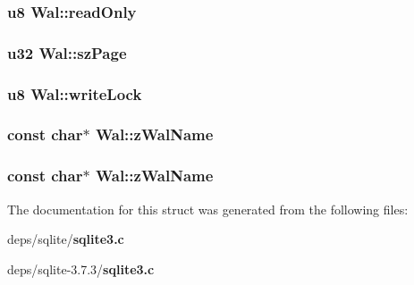 \subsubsection{\setlength{\rightskip}{0pt plus 5cm}\bf{u8} \bf{Wal::read\-Only}}\label{structWal_908175d91380ac160cc6b56990682e7d}


\subsubsection{\setlength{\rightskip}{0pt plus 5cm}\bf{u32} \bf{Wal::sz\-Page}}\label{structWal_c554b167375ea0923cec25a4037a9e8f}


\subsubsection{\setlength{\rightskip}{0pt plus 5cm}\bf{u8} \bf{Wal::write\-Lock}}\label{structWal_d87dc8bf96a523c3e8402ab030a92468}


\subsubsection{\setlength{\rightskip}{0pt plus 5cm}const char$\ast$ \bf{Wal::z\-Wal\-Name}}\label{structWal_6b5cf0f930c69a03294911edba8ab1a2}


\subsubsection{\setlength{\rightskip}{0pt plus 5cm}const char$\ast$ \bf{Wal::z\-Wal\-Name}}\label{structWal_6b5cf0f930c69a03294911edba8ab1a2}




The documentation for this struct was generated from the following files:\begin{CompactItemize}
\item 
deps/sqlite/\bf{sqlite3.c}\item 
deps/sqlite-3.7.3/\bf{sqlite3.c}\end{CompactItemize}
